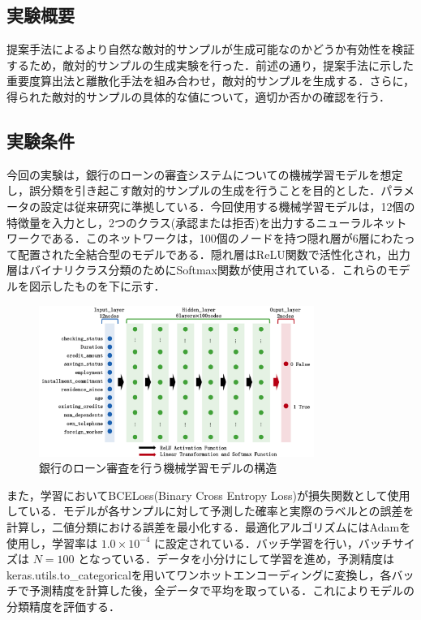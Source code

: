 \subsection{実験概要}
提案手法によるより自然な敵対的サンプルが生成可能なのかどうか有効性を検証するため，敵対的サンプルの生成実験を行った．前述の通り，提案手法に示した重要度算出法と離散化手法を組み合わせ，敵対的サンプルを生成する．さらに，得られた敵対的サンプルの具体的な値について，適切か否かの確認を行う．
\subsection{実験条件}
今回の実験は，銀行のローンの審査システムについての機械学習モデルを想定し，誤分類を引き起こす敵対的サンプルの生成を行うことを目的とした．パラメータの設定は従来研究\cite{ballet2019imperceptible}に準拠している．今回使用する機械学習モデルは，12個の特徴量を入力とし，2つのクラス(承認または拒否)を出力するニューラルネットワークである．このネットワークは，100個のノードを持つ隠れ層が6層にわたって配置された全結合型のモデルである．隠れ層はReLU関数で活性化され，出力層はバイナリクラス分類のためにSoftmax関数が使用されている．これらのモデルを図示したものを下に示す．

\begin{figure}[H]
    \centering
    \includegraphics[width=0.8\textwidth]{images/審査モデル.png}
    \caption{銀行のローン審査を行う機械学習モデルの構造}
    \label{fig:adversarial_example}
\end{figure}

また，学習においてBCELoss(Binary Cross Entropy Loss)が損失関数として使用している．モデルが各サンプルに対して予測した確率と実際のラベルとの誤差を計算し，二値分類における誤差を最小化する．最適化アルゴリズムにはAdamを使用し，学習率は $1.0 \times 10^{-4}$ に設定されている．バッチ学習を行い，バッチサイズは $N=100$ となっている．データを小分けにして学習を進め，予測精度はkeras.utils.to\_categoricalを用いてワンホットエンコーディングに変換し，各バッチで予測精度を計算した後，全データで平均を取っている．これによりモデルの分類精度を評価する．

